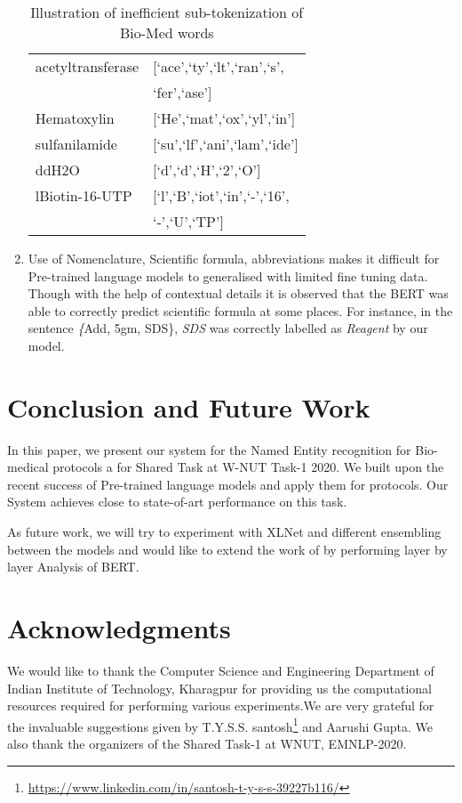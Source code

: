\documentclass[11pt,a4paper]{article}
\begin{document}
\begin{enumerate}
\begin{table}
\begin{tabular}{ll}
 acetyltransferase & [`ace',`ty',`lt',`ran',`s',\\
 & `fer',`ase'] \\
 Hematoxylin & [`He',`mat',`ox',`yl',`in'] \\
 sulfanilamide & [`su',`lf',`ani',`lam',`ide'] \\
 ddH2O & [`d',`d',`H',`2',`O'] \\
 lBiotin-16-UTP & [`l',`B',`iot',`in',`-',`16',\\
 & `-',`U',`TP'] \\


\hline
\end{tabular}
\caption{\label{tokenizer} Illustration of inefficient sub-tokenization of Bio-Med words  }
\end{table}


\item Use of Nomenclature, Scientific formula, abbreviations makes it difficult for Pre-trained language models to generalised with limited fine tuning data. Though with the help of contextual details it is observed that the BERT was able to correctly predict scientific formula at some places. For instance, in the sentence \textit\{Add, 5gm, SDS\},  \textit{SDS} was correctly labelled as \textit{Reagent} by our model.


\end{enumerate}


\section{Conclusion and Future Work}
In this paper, we present our system for the Named Entity recognition for Bio-medical protocols a for Shared Task at W-NUT Task-1 2020. We built upon the recent success of Pre-trained language models and
apply them for protocols. Our System achieves close to state-of-art performance on this task.

As future work, we will try to experiment with XLNet\cite{xlnet} and different ensembling between the models and would like to extend the work of  \citet{clark_et_al_2019} by performing layer by layer Analysis of  BERT.



\section*{Acknowledgments}
We would like to thank the Computer Science
and Engineering Department of Indian Institute of Technology, Kharagpur for providing us
the computational resources required for performing various experiments.We are very grateful for the invaluable suggestions given by T.Y.S.S. santosh\footnote{\url{https://www.linkedin.com/in/santosh-t-y-s-s-39227b116/}} and Aarushi Gupta. We also thank the organizers of the Shared Task-1 at WNUT, EMNLP-2020.


\end{document}

